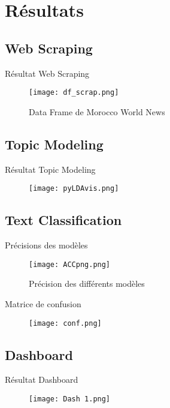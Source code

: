 \documentclass[10pt,sans,usenames,dvipsnames,english,compress]{beamer}
\begin{document}
\section{Résultats}
\subsection{Web Scraping}
\begin{frame}{Résultat Web Scraping}
    \begin{figure}[!h]
    \centering
    \texttt{[image: df\_scrap.png]}
    \caption{Data Frame de Morocco World News}
    \end{figure}
\end{frame}

\subsection{Topic Modeling}
\begin{frame}{Résultat Topic Modeling}
    \begin{figure}[!h]
    \centering
    \texttt{[image: pyLDAvis.png]}
    \end{figure}
\end{frame}

\subsection{Text Classification}
\begin{frame}{Précisions des modèles}
    \begin{figure}[!h]
    \centering
    \texttt{[image: ACCpng.png]}
    \caption{Précision des différents modèles}
    \end{figure}
\end{frame}

\begin{frame}{Matrice de confusion}
    \begin{figure}[!h]
    \centering
    \texttt{[image: conf.png]}
    \end{figure}
\end{frame}

\subsection{Dashboard}
\begin{frame}{Résultat Dashboard}
    \begin{figure}[!h]
    \centering
    \texttt{[image: Dash 1.png]}
    \end{figure}
\end{frame}
\end{document}
